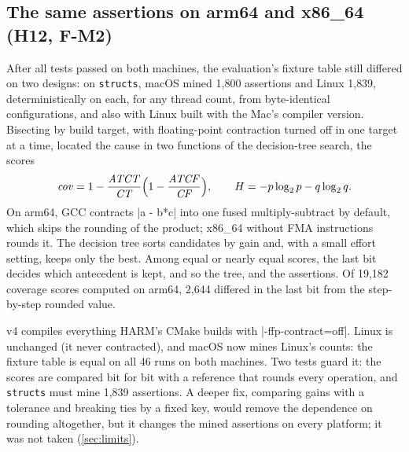 \subsection{The same assertions on arm64 and x86\_64 (H12, F-M2)}\label{sec:fma}
After all tests passed on both machines, the evaluation's fixture table still differed on two designs: on \texttt{structs}, macOS mined 1{,}800 assertions and Linux 1{,}839, deterministically on each, for any thread count, from byte-identical configurations, and also with Linux built with the Mac's compiler version. Bisecting by build target, with floating-point contraction turned off in one target at a time, located the cause in two functions of the decision-tree search, the scores
\[
\mathit{cov} = 1 - \frac{\mathit{ATCT}}{\mathit{CT}}\Bigl(1 - \frac{\mathit{ATCF}}{\mathit{CF}}\Bigr), \qquad
H = -p\log_2 p - q \log_2 q .
\]
On arm64, GCC contracts \code|a - b*c| into one fused multiply-subtract by default, which skips the rounding of the product; x86\_64 without FMA instructions rounds it. The decision tree sorts candidates by gain and, with a small effort setting, keeps only the best. Among equal or nearly equal scores, the last bit decides which antecedent is kept, and so the tree, and the assertions. Of 19{,}182 coverage scores computed on arm64, 2{,}644 differed in the last bit from the step-by-step rounded value.

v4 compiles everything HARM's CMake builds with \code|-ffp-contract=off|. Linux is unchanged (it never contracted), and macOS now mines Linux's counts: the fixture table is equal on all 46 runs on both machines. Two tests guard it: the scores are compared bit for bit with a reference that rounds every operation, and \texttt{structs} must mine 1{,}839 assertions. A deeper fix, comparing gains with a tolerance and breaking ties by a fixed key, would remove the dependence on rounding altogether, but it changes the mined assertions on every platform; it was not taken (\cref{sec:limits}).

